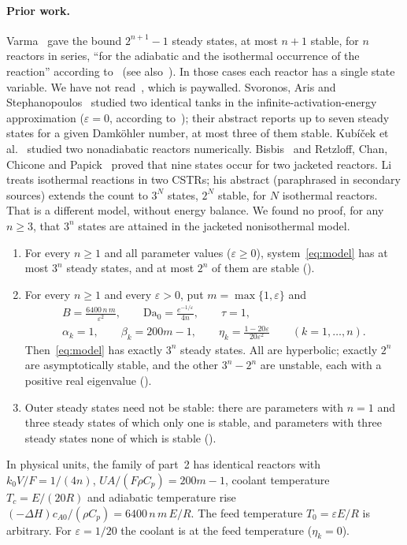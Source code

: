 \documentclass[11pt,a4paper]{report}
\newcommand*{\Da}{\mathrm{Da}_0}
\newcommand*{\eps}{\varepsilon}
\begin{document}
\paragraph{Prior work.} Varma~\autocite{Varma1980} gave the bound \(2^{n+1}-1\) steady states, at most \(n+1\) stable,
for \(n\) reactors in series, ``for the adiabatic and the isothermal occurrence of the reaction'' according
to~\autocite{Bisbis1987} (see also~\autocite{GalanicsSzalai2024}). In those cases each reactor has a single state
variable. We have not read~\autocite{Varma1980}, which is paywalled. Svoronos, Aris and
Stephanopoulos~\autocite{Svoronos1982} studied two identical tanks in the infinite-activation-energy approximation
(\(\eps=0\), according to~\autocite{Bisbis1987}); their abstract reports up to seven steady states for a given
Damköhler number, at most three of them stable. Kubíček et al.~\autocite{Kubicek1980} studied two nonadiabatic
reactors numerically. Bisbis~\autocite{Bisbis1987} and Retzloff, Chan, Chicone and Papick~\autocite{Retzloff1992} proved that
nine states occur for two jacketed reactors. Li~\autocite{Li1994} treats isothermal reactions in two CSTRs; his
abstract (paraphrased in secondary sources) extends the count to \(3^N\) states, \(2^N\) stable, for \(N\) isothermal
reactors. That is a different model, without energy balance. We found no proof, for any \(n\ge3\), that \(3^n\)
states are attained in the jacketed nonisothermal model.

\begin{theorem}[note={main result}]\label{thm:main}
\begin{enumerate}
\item For every \(n\ge1\) and all parameter values (\(\eps\ge0\)), system~\eqref{eq:model} has at most \(3^n\) steady
states, and at most \(2^n\) of them are stable ().
\item For every \(n\ge1\) and every \(\eps>0\), put \(m=\max\{1,\eps\}\) and
\begin{gather*}
B=\frac{6400\,n\,m}{\eps^2},\qquad \Da=\frac{e^{-1/\eps}}{4n},\qquad \tau=1,\\
\alpha_k=1,\qquad \beta_k=200m-1,\qquad \eta_k=\frac{1-20\eps}{20\eps^2}\qquad(k=1,\dots,n).
\end{gather*}
Then~\eqref{eq:model} has exactly \(3^n\) steady states. All are hyperbolic; exactly \(2^n\) are asymptotically
stable, and the other \(3^n-2^n\) are unstable, each with a positive real eigenvalue ().
\item Outer steady states need not be stable: there are parameters with \(n=1\) and three steady states of which only
one is stable, and parameters with three steady states none of which is stable ().
\end{enumerate}
\end{theorem}
In physical units, the family of part~2 has identical reactors with \(k_0V/F=1/(4n)\), \(UA/(F\rho C_p)=200m-1\),
coolant temperature \(T_c=E/(20R)\) and adiabatic temperature rise \((-\Delta H)c_{A0}/(\rho C_p)=6400\,n\,m\,E/R\). The
feed temperature \(T_0=\eps E/R\) is arbitrary. For \(\eps=1/20\) the coolant is at the feed temperature
(\(\eta_k=0\)).
\end{document}
